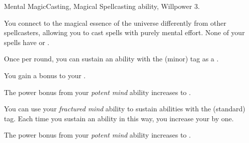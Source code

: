     \begin{feat}{Mental Magic}{Casting, Magical}
        \featpre Spellcasting ability, Willpower 3.

         You connect to the magical essence of the universe differently from other spellcasters, allowing you to cast spells with purely mental effort.
        None of your spells have  or .

         Once per round, you can sustain an ability with the  (minor) tag as a .

         You gain a  bonus to your .

         The power bonus from your \textit{potent mind} ability increases to .

         You can use your \textit{fractured mind} ability to sustain abilities with the  (standard) tag.
        Each time you sustain an ability in this way, you increase your  by one.

         The power bonus from your \textit{potent mind} ability increases to .
    \end{feat}

